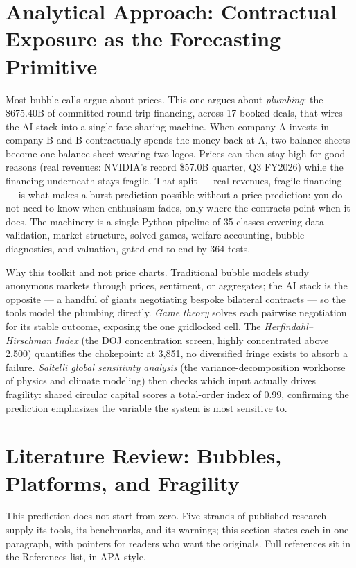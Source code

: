\documentclass[11pt,a4paper]{article}
\begin{document}
\section{Analytical Approach: Contractual Exposure as the Forecasting Primitive}\label{sec:foundation}
Most bubble calls argue about prices. This one argues about \emph{plumbing}:
the \$675.40B of committed round-trip financing, across 17 booked deals,
that wires the AI stack into a single fate-sharing machine. When company A
invests in company B and B contractually spends the money back at A, two
balance sheets become one balance sheet wearing two logos. Prices can then
stay high for good reasons (real revenues: NVIDIA's record \$57.0B quarter, Q3 FY2026)
while the financing underneath stays fragile. That split --- real revenues,
fragile financing --- is what makes a burst prediction possible without a
price prediction: you do not need to know when enthusiasm fades, only where
the contracts point when it does. The machinery is a single Python
pipeline of 35 classes covering data validation, market structure, solved
games, welfare accounting, bubble diagnostics, and valuation, gated end to
end by 364 tests.

Why this toolkit and not price charts. Traditional bubble models study
anonymous markets through prices, sentiment, or aggregates; the AI stack is
the opposite --- a handful of giants negotiating bespoke bilateral
contracts --- so the tools model the plumbing directly. \emph{Game theory}
solves each pairwise negotiation for its stable outcome, exposing the one
gridlocked cell. The \emph{Herfindahl--Hirschman Index} (the DOJ
concentration screen, highly concentrated above 2,500) quantifies the
chokepoint: at 3,851, no diversified fringe exists to absorb a failure.
\emph{Saltelli global sensitivity analysis} (the variance-decomposition
workhorse of physics and climate modeling) then checks which input actually
drives fragility: shared circular capital scores a total-order index of
0.99, confirming the prediction emphasizes the variable the system is most
sensitive to.

\section{Literature Review: Bubbles, Platforms, and Fragility}\label{sec:literature}
This prediction does not start from zero. Five strands of published research
supply its tools, its benchmarks, and its warnings; this section states each
in one paragraph, with pointers for readers who want the originals. Full
references sit in the References list, in APA style.
\end{document}
